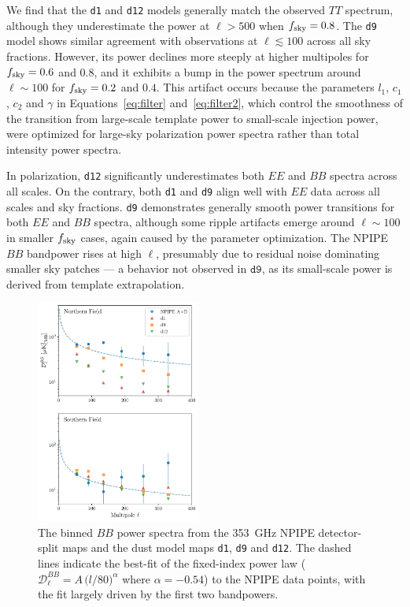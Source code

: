 \documentclass[twocolumn]{aastex631}
\begin{document}
We find that the \texttt{d1} and \texttt{d12} models generally match the observed $TT$ spectrum, although they underestimate the power at $\ell > 500$ when $f_{\rm sky} = 0.8$. The \texttt{d9} model shows similar agreement with observations at $\ell \lesssim 100$ across all sky fractions. However, its power declines more steeply at higher multipoles for $f_{\rm sky} = 0.6$ and $0.8$, and it exhibits a bump in the power spectrum around $\ell \sim 100$ for $f_{\rm sky} = 0.2$ and $0.4$. This artifact occurs because the parameters $l_1$, $c_1$, $c_2$ and $\gamma$ in Equations~\ref{eq:filter} and~\ref{eq:filter2}, which control the smoothness of the transition from large-scale template power to small-scale injection power, were optimized for large-sky polarization power spectra rather than total intensity power spectra. 

In polarization, \texttt{d12} significantly underestimates both $EE$ and $BB$ spectra across all scales. On the contrary, both \texttt{d1} and \texttt{d9} align well with $EE$ data across all scales and sky fractions. \texttt{d9} demonstrates generally smooth power transitions for both $EE$ and $BB$ spectra, although some ripple artifacts emerge around $\ell \sim 100$ in smaller $f_{\rm sky}$ cases, again caused by the parameter optimization. The NPIPE $BB$ bandpower rises at high $\ell$, presumably due to residual noise dominating smaller sky patches --- a behavior not observed in $\texttt{d9}$, as its small-scale power is derived from template extrapolation. 

\begin{figure}
    \centering
    \includegraphics[width=0.48\textwidth]{figures/smallfield_power.pdf}
    \caption{The binned $BB$ power spectra from the 353~GHz NPIPE detector-split maps and the dust model maps \texttt{d1}, \texttt{d9} and \texttt{d12}. The dashed lines indicate the best-fit of the fixed-index power law ($\mathcal{D}_\ell^{BB} = A \, \big( l/80 \big)^{\alpha}$ where $\alpha = -0.54$) to the NPIPE data points, with the fit largely driven by the first two bandpowers.}
    \label{fig:smallfield_power}
\end{figure}
\end{document}
